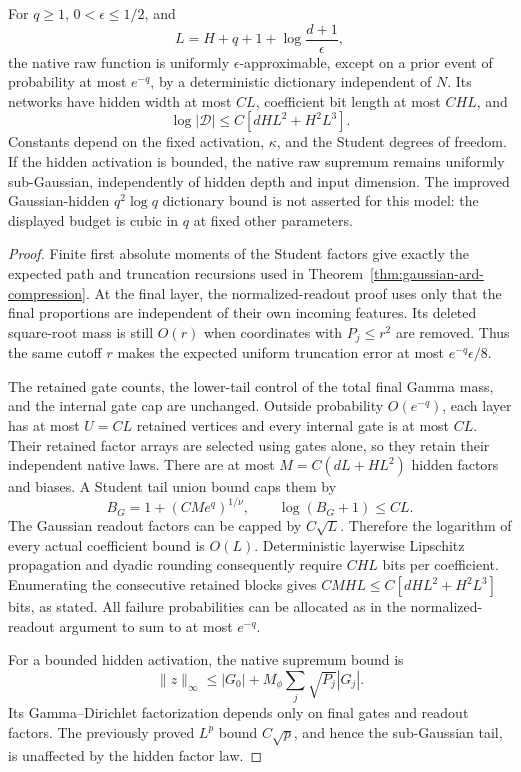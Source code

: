 \begin{corollary}
\label{cor:student-hidden-compression}
For $q\ge1$, $0<\epsilon\le1/2$, and
\[
 L=H+q+1+\log\frac{d+1}{\epsilon},
\]
the native raw function is uniformly $\epsilon$-approximable, except on a prior event of probability at most $e^{-q}$, by a deterministic dictionary independent of $N$. Its networks have hidden width at most $CL$, coefficient bit length at most $CHL$, and
\[
 \log|\mathcal D|\le C[dHL^2+H^2L^3].
\]
Constants depend on the fixed activation, $\kappa$, and the Student degrees of freedom. If the hidden activation is bounded, the native raw supremum remains uniformly sub-Gaussian, independently of hidden depth and input dimension. The improved Gaussian-hidden $q^2\log q$ dictionary bound is not asserted for this model: the displayed budget is cubic in $q$ at fixed other parameters.
\end{corollary}
\begin{proof}
Finite first absolute moments of the Student factors give exactly the expected path and truncation recursions used in Theorem~\ref{thm:gaussian-ard-compression}. At the final layer, the normalized-readout proof uses only that the final proportions are independent of their own incoming features. Its deleted square-root mass is still $O(r)$ when coordinates with $P_j\le r^2$ are removed. Thus the same cutoff $r$ makes the expected uniform truncation error at most $e^{-q}\epsilon/8$.

The retained gate counts, the lower-tail control of the total final Gamma mass, and the internal gate cap are unchanged. Outside probability $O(e^{-q})$, each layer has at most $U=CL$ retained vertices and every internal gate is at most $CL$. Their retained factor arrays are selected using gates alone, so they retain their independent native laws. There are at most $M=C(dL+HL^2)$ hidden factors and biases. A Student tail union bound caps them by
\[
 B_G=1+(CM e^q)^{1/\nu},\qquad \log(B_G+1)\le CL.
\]
The Gaussian readout factors can be capped by $C\sqrt L$. Therefore the logarithm of every actual coefficient bound is $O(L)$. Deterministic layerwise Lipschitz propagation and dyadic rounding consequently require $CHL$ bits per coefficient. Enumerating the consecutive retained blocks gives
$CMHL\le C[dHL^2+H^2L^3]$ bits, as stated. All failure probabilities can be allocated as in the normalized-readout argument to sum to at most $e^{-q}$.

For a bounded hidden activation, the native supremum bound is
\[
 \|z\|_\infty\le|G_0|+M_\phi\sum_j\sqrt{P_j}|G_j|.
\]
Its Gamma--Dirichlet factorization depends only on final gates and readout factors. The previously proved $L^p$ bound $C\sqrt p$, and hence the sub-Gaussian tail, is unaffected by the hidden factor law.
\end{proof}
